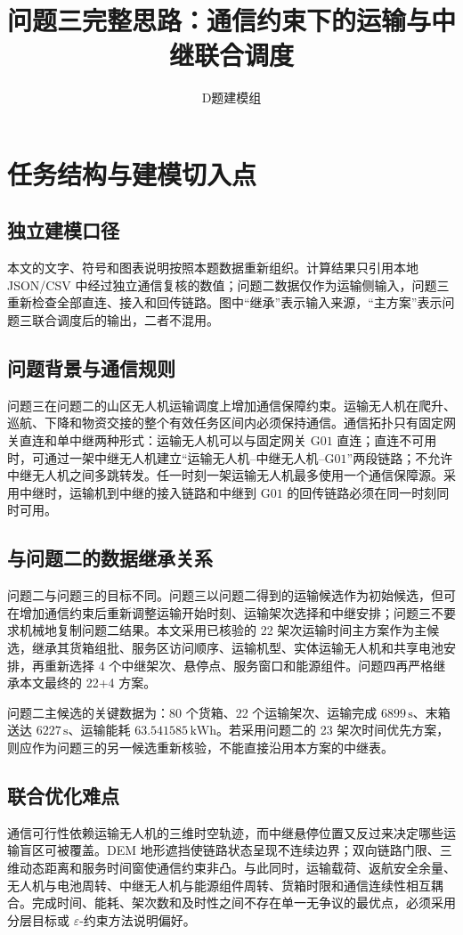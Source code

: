 \documentclass[UTF8,a4paper,12pt]{ctexart}
\title{问题三完整思路：通信约束下的运输与中继联合调度}
\author{D题建模组}
\date{}
\newcommand{\Gone}{\mathrm{G01}}
\begin{document}
\maketitle
\tableofcontents

\section{任务结构与建模切入点}
\subsection{独立建模口径}
本文的文字、符号和图表说明按照本题数据重新组织。计算结果只引用本地 JSON/CSV 中经过独立通信复核的数值；问题二数据仅作为运输侧输入，问题三重新检查全部直连、接入和回传链路。图中“继承”表示输入来源，“主方案”表示问题三联合调度后的输出，二者不混用。


\subsection{问题背景与通信规则}
问题三在问题二的山区无人机运输调度上增加通信保障约束。运输无人机在爬升、巡航、下降和物资交接的整个有效任务区间内必须保持通信。通信拓扑只有固定网关直连和单中继两种形式：运输无人机可以与固定网关 $\Gone$ 直连；直连不可用时，可通过一架中继无人机建立“运输无人机--中继无人机--$\Gone$”两段链路；不允许中继无人机之间多跳转发。任一时刻一架运输无人机最多使用一个通信保障源。采用中继时，运输机到中继的接入链路和中继到 $\Gone$ 的回传链路必须在同一时刻同时可用。

\subsection{与问题二的数据继承关系}
问题二与问题三的目标不同。问题三以问题二得到的运输候选作为初始候选，但可在增加通信约束后重新调整运输开始时刻、运输架次选择和中继安排；问题三不要求机械地复制问题二结果。本文采用已核验的 22 架次运输时间主方案作为主候选，继承其货箱组批、服务区访问顺序、运输机型、实体运输无人机和共享电池安排，再重新选择 4 个中继架次、悬停点、服务窗口和能源组件。问题四再严格继承本文最终的 22+4 方案。

问题二主候选的关键数据为：80 个货箱、22 个运输架次、运输完成 $6899\,\mathrm{s}$、末箱送达 $6227\,\mathrm{s}$、运输能耗 $63.541585\,\mathrm{kWh}$。若采用问题二的 23 架次时间优先方案，则应作为问题三的另一候选重新核验，不能直接沿用本方案的中继表。

\subsection{联合优化难点}
通信可行性依赖运输无人机的三维时空轨迹，而中继悬停位置又反过来决定哪些运输盲区可被覆盖。DEM 地形遮挡使链路状态呈现不连续边界；双向链路门限、三维动态距离和服务时间窗使通信约束非凸。与此同时，运输载荷、返航安全余量、无人机与电池周转、中继无人机与能源组件周转、货箱时限和通信连续性相互耦合。完成时间、能耗、架次数和及时性之间不存在单一无争议的最优点，必须采用分层目标或 $\varepsilon$-约束方法说明偏好。
\end{document}
